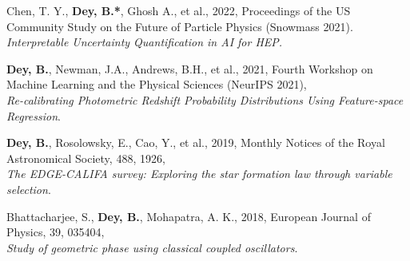    \item Chen, T. Y., \textbf{Dey, B.*}, Ghosh A., et al., 2022, Proceedings of the US Community Study on the Future of Particle Physics (Snowmass 2021). \\ \textit{Interpretable Uncertainty Quantification in AI for HEP.}
    
    
   
    \item \textbf{Dey, B.}, Newman, J.A., Andrews, B.H., et al., 2021, Fourth Workshop on Machine Learning and the Physical Sciences (NeurIPS 2021),\\ \textit{Re-calibrating Photometric Redshift Probability Distributions Using Feature-space Regression}. 
    

    \item \textbf{Dey, B.}, Rosolowsky, E., Cao, Y., et al., 2019, Monthly Notices of the Royal Astronomical Society, 488, 1926, \\ \textit{The EDGE-CALIFA survey: Exploring the star formation law through variable selection}.
    

   \item Bhattacharjee, S.,\textbf{ Dey, B.}, Mohapatra, A. K., 2018, European Journal of Physics, 39, 035404, \\ \textit{Study of geometric phase using classical coupled oscillators}. 
   



   